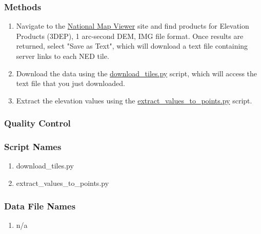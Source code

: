 \subsubsection*{Methods}
\begin{enumerate}
\item Navigate to the \href{https://viewer.nationalmap.gov/basic/?basemap=b1&category=ned,nedsrc&title=3DEP%20View}{National Map Viewer} site and find products for Elevation Products (3DEP), 1 arc-second DEM, IMG file format. Once results are returned, select "Save as Text", which will download a text file containing server links to each NED tile.
\item Download the data using the \href{https://github.com/earthlab/estimate-pm25/blob/master/download-earth-observations/NED/download_tiles.py}{download\_tiles.py} script, which will access the text file that you just downloaded.
\item Extract the elevation values using the \href{https://github.com/earthlab/estimate-pm25/blob/master/download-earth-observations/NED/extract_values_to_points.py}{extract\_values\_to\_points.py} script.
\end{enumerate}
\subsubsection*{Quality Control}
\subsubsection*{Script Names}
\begin{enumerate}
\item download\_tiles.py
\item extract\_values\_to\_points.py
\end{enumerate}
\subsubsection*{Data File Names}
\begin{enumerate}
\item n/a
\end{enumerate}